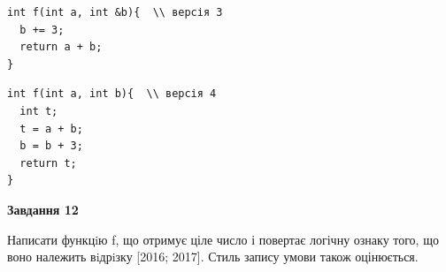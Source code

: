 \documentclass[12pt, ukrainian]{article}
\begin{document}
{\begin {large}
\begin{minipage}[t]{11.0cm}
\vspace{-8mm}\begin{verbatim}
int f(int a, int &b){  \\ версія 3
  b += 3;
  return a + b;
}
\end{verbatim}

\vspace{-8mm}\begin{verbatim}
int f(int a, int b){  \\ версія 4
  int t;
  t = a + b;
  b = b + 3;
  return t;
}
\end{verbatim}



\begin{center}
\textbf{Завдання 12}
\end{center}

Написати функцiю f, що отримує ціле число і повертає логічну ознаку того, що воно належить вiдрiзку [2016; 2017]. Стиль запису умови також оцінюється.\par

\end{minipage}

\end {large}}
\newpage
\end{document}
